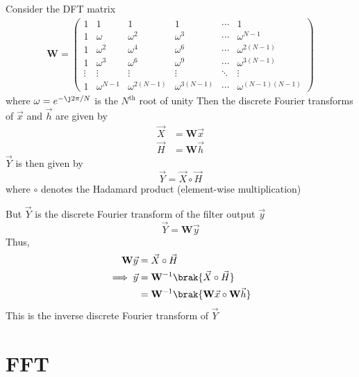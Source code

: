 \documentclass[journal,12pt,twocolumn]{IEEEtran}
\newcommand{\myvec}[1]{\ensuremath{\begin{pmatrix}#1\end{pmatrix}}}
\renewcommand\thesection{\arabic{section}}
\begin{document}
\begin{enumerate}[label=\thesection.\arabic*]
	Consider the DFT matrix
	\begin{align}
		\mathbf{W} = \myvec{
			1 & 1 & 1 & 1 & \cdots & 1 \\
			1 & \omega & \omega^2 & \omega^3 & \cdots & \omega^{N-1} \\
			1 & \omega^2 & \omega^4 & \omega^6 & \cdots & \omega^{2(N-1)} \\
			1 & \omega^3 & \omega^6 & \omega^9 & \cdots & \omega^{3(N-1)} \\
			\vdots & \vdots & \vdots & \vdots & \ddots & \vdots \\ 
			1 & \omega^{N-1} & \omega^{2(N-1)} & \omega^{3(N-1)} & \cdots & \omega^{(N-1)(N-1)}
		}
	\end{align}
	where $\omega = e^{-\j 2\pi/N}$ is the $N^{\mathrm{th}}$ root of unity	
	Then the discrete Fourier transforms of $\vec{x}$ and $\vec{h}$ are given by
	\begin{align}
		\vec{X} &= \mathbf{W} \vec{x} \\
		\vec{H} &= \mathbf{W} \vec{h}
	\end{align}
	$\vec{Y}$ is then given by
	\begin{equation}
		\vec{Y} = \vec{X} \circ \vec{H}
	\end{equation}
	where $\circ$ denotes the Hadamard product (element-wise multiplication)
	
	But $\vec{Y}$ is the discrete Fourier transform of the filter output $\vec{y}$
	\begin{equation}
		\vec{Y} = \mathbf{W} \vec{y}
	\end{equation}
	Thus,
	\begin{align}
		\mathbf{W} \vec{y} &= \vec{X} \circ \vec{H} \\
		\implies \vec{y} &= \mathbf{W}^{-1} \brak{\vec{X} \circ \vec{H}} \\
		&= \mathbf{W}^{-1} \brak{\mathbf{W} \vec{x} \circ \mathbf{W} \vec{h}}
	\end{align}
	This is the inverse discrete Fourier transform of $\vec{Y}$
\end{enumerate}
%
\section{FFT}
\end{document}
